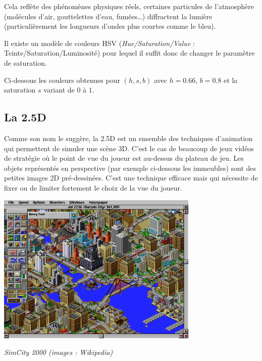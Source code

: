 \documentclass[11pt,class=report,crop=false]{standalone}
\begin{document}
Cela reflète des phénomènes physiques réels, certaines particules de l'atmosphère (molécules d'air, gouttelettes d'eau, fumées\ldots) diffractent la lumière (particulièrement les longueurs d'ondes plus courtes comme le bleu).



Il existe un modèle de couleurs HSV (\emph{Hue/Saturation/Value} : Teinte/Saturation/Luminosité) pour lequel il suffit donc de changer le paramètre de saturation.

Ci-dessous les couleurs obtenues pour $(h,s,b)$ avec $h=0.66$, $b=0.8$ et la saturation $s$ variant de $0$ à $1$.

\subsection{La 2.5D}

Comme son nom le suggère, la 2.5D est un ensemble des techniques d'animation qui permettent de simuler une scène 3D. C'est le cas de beaucoup de jeux vidéos de stratégie où le point de vue du joueur est au-dessus du plateau de jeu. Les objets représentés en perspective (par exemple ci-dessous les immeubles) sont des petites images 2D pré-dessinées.
C'est une technique efficace mais qui nécessite de fixer ou de limiter fortement le choix de la vue du joueur.
   
\begin{center}
	\includegraphics[scale=\myscale,scale=0.6]{figures/simcity}
	
	\emph{SimCity 2000 (images : Wikipedia)}
\end{center}

\end{document}
